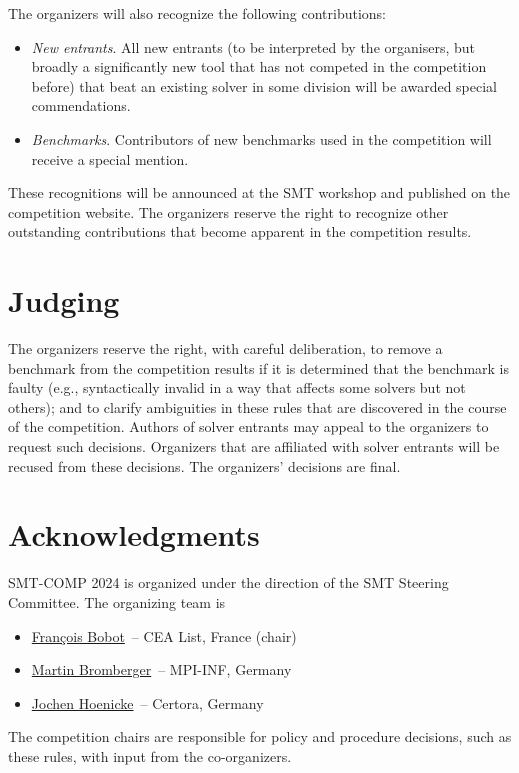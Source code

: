 \documentclass[12pt]{article}
\begin{document}
The organizers will also recognize the following contributions:
%
\begin{itemize}
\item \emph{New entrants}. All new entrants (to be interpreted by the organisers, but broadly a significantly new tool that has not competed in the competition before) that beat an existing solver in some division will be awarded special commendations.
\item \emph{Benchmarks}. Contributors of new benchmarks used in the competition will receive a special mention.
\end{itemize}
%
These recognitions will be announced at the SMT workshop and published on the competition website.
The organizers reserve the right to recognize other outstanding
contributions that become apparent in the competition results.



\section{Judging}

The organizers reserve the right, with careful deliberation, to remove
a benchmark from the competition results if it is determined that the
benchmark is faulty (e.g., syntactically invalid in a way that affects
some solvers but not others); and to clarify ambiguities in these
rules that are discovered in the course of the competition.  Authors
of solver entrants may appeal to the organizers to request such
decisions.  Organizers that are affiliated with solver entrants will
be recused from these decisions.  The organizers' decisions are final.


\section{Acknowledgments}

SMT-COMP 2024 is organized under the direction of the SMT Steering
Committee. The organizing team is
%
\begin{itemize}
\setlength{\itemsep}{0pt}
\item \href{https://github.com/bobot}{Fran\c{c}ois Bobot}~-- CEA List, France (chair)
\item \href{https://www.mpi-inf.mpg.de/departments/automation-of-logic/people/martin-bromberger}{Martin Bromberger}~-- MPI-INF, Germany
\item \href{https://jochen-hoenicke.de/}{Jochen Hoenicke}~-- Certora, Germany
\end{itemize}
%
The competition chairs are responsible for policy and procedure decisions,
such as these rules, with input from the co-organizers.
\end{document}
